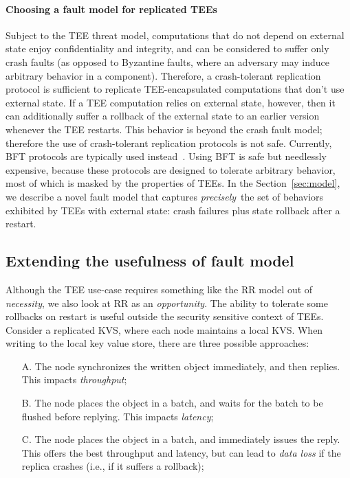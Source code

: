 \paragraph{Choosing a fault model for replicated \acp{TEE}}

Subject to the \ac{TEE} threat model, computations that do not depend on
external state enjoy confidentiality and integrity, and can be
considered to suffer only crash faults (as opposed to Byzantine
faults, where an adversary may induce arbitrary behavior in a
component). Therefore, a crash-tolerant replication protocol is sufficient
to replicate \ac{TEE}-encapsulated computations that don't use external
state.  If a \ac{TEE} computation relies on external state, however, then
it can additionally suffer a rollback of the external state to an
earlier version whenever the \ac{TEE} restarts.  This behavior is beyond
the crash fault model; therefore the use of crash-tolerant replication
protocols is not safe. Currently, \ac{BFT} protocols are typically used
instead~\cite{teechain,rote}.  Using \ac{BFT} is safe but needlessly
expensive, because these protocols are designed to tolerate arbitrary
behavior, most of which is masked by the properties of \acp{TEE}.
In the Section~\ref{sec:model}, we describe a novel fault model that
captures {\em precisely}\ the set of behaviors exhibited by \acp{TEE} with
external state: crash failures plus state rollback after a restart.

\subsection{Extending the usefulness of fault model}\label{sec:extending_fault_model}

Although the \ac{TEE} use-case requires something like the
\ac{RR} model out of \emph{necessity}, we also look at \ac{RR} as
an \emph{opportunity}. The ability to tolerate some rollbacks on
restart is useful outside the security sensitive context of
\acp{TEE}. Consider a replicated \ac{KVS}, where each node
maintains a local \ac{KVS}. When writing to the local key
value store, there are three possible approaches:
\begin{enumerate}
    \item[A.] The node synchronizes the written object
        immediately, and then replies. This impacts
        \emph{throughput};
    \item[B.] The node places the object in a batch, and waits
        for the batch to be flushed before replying. This impacts
        \emph{latency};
    \item[C.] The node places the object in a batch, and
        immediately issues the reply. This offers the best
        throughput and latency, but can lead to \emph{data loss}
        if the replica crashes (i.e., if it suffers a rollback);
\end{enumerate}

